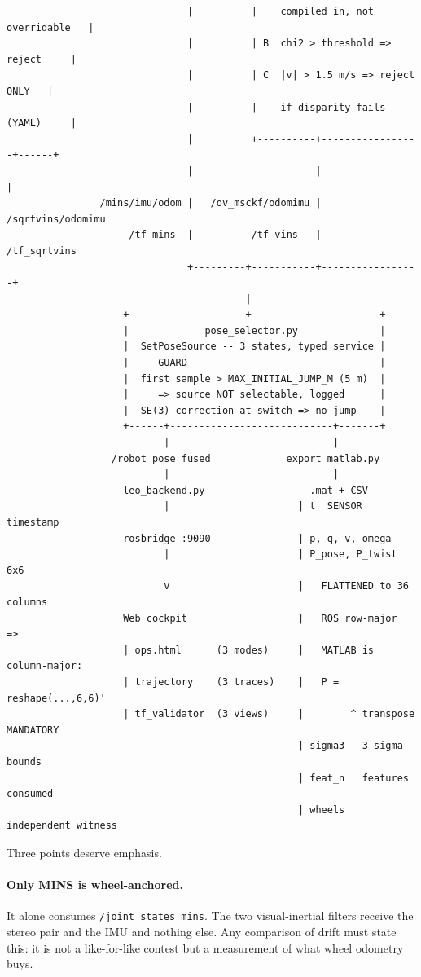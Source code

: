 \begin{verbatim}
                               |          |    compiled in, not overridable   |
                               |          | B  chi2 > threshold => reject     |
                               |          | C  |v| > 1.5 m/s => reject ONLY   |
                               |          |    if disparity fails  (YAML)     |
                               |          +----------+-----------------+------+
                               |                     |                 |
                /mins/imu/odom |   /ov_msckf/odomimu |  /sqrtvins/odomimu
                     /tf_mins  |          /tf_vins   |     /tf_sqrtvins
                               +---------+-----------+-----------------+
                                         |
                    +--------------------+----------------------+
                    |             pose_selector.py              |
                    |  SetPoseSource -- 3 states, typed service |
                    |  -- GUARD ------------------------------  |
                    |  first sample > MAX_INITIAL_JUMP_M (5 m)  |
                    |     => source NOT selectable, logged      |
                    |  SE(3) correction at switch => no jump    |
                    +------+----------------------------+-------+
                           |                            |
                  /robot_pose_fused             export_matlab.py
                           |                            |
                    leo_backend.py                  .mat + CSV
                           |                      | t  SENSOR timestamp
                    rosbridge :9090               | p, q, v, omega
                           |                      | P_pose, P_twist  6x6
                           v                      |   FLATTENED to 36 columns
                    Web cockpit                   |   ROS row-major  =>
                    | ops.html      (3 modes)     |   MATLAB is column-major:
                    | trajectory    (3 traces)    |   P = reshape(...,6,6)'
                    | tf_validator  (3 views)     |        ^ transpose MANDATORY
                                                  | sigma3   3-sigma bounds
                                                  | feat_n   features consumed
                                                  | wheels   independent witness
\end{verbatim}

Three points deserve emphasis.

\paragraph{Only MINS is wheel-anchored.} It alone consumes
\texttt{/joint\_states\_mins}. The two visual-inertial filters receive the
stereo pair and the IMU and nothing else. Any comparison of drift must state
this: it is not a like-for-like contest but a measurement of what wheel
odometry buys.

